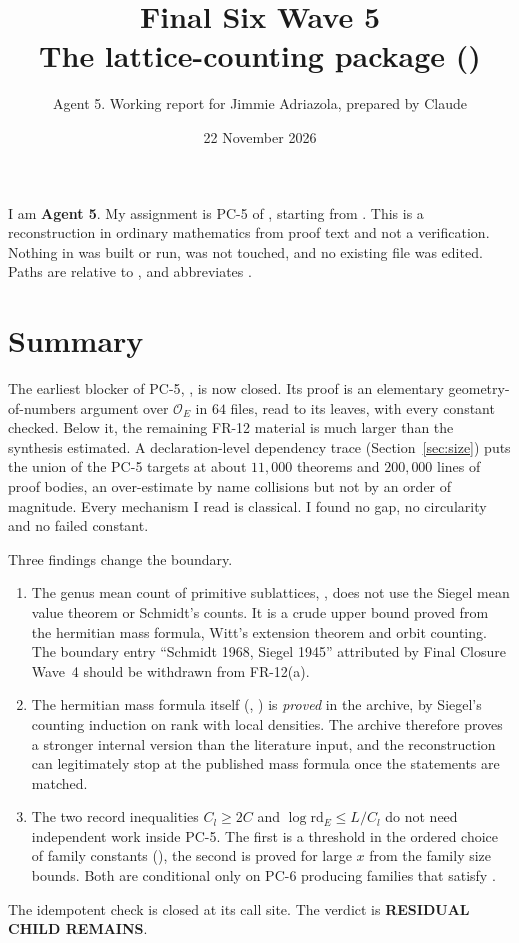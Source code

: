 \documentclass[11pt]{article}
\title{Final Six Wave 5\\ The \FR{12} lattice-counting package (\PC{5})}
\author{Agent 5. Working report for Jimmie Adriazola, prepared by Claude}
\date{22 November 2026}
\newcommand{\FR}[1]{\textsf{FR-#1}}
\newcommand{\PC}[1]{\textsf{PC-#1}}
\newcommand{\Ok}{\mathcal O}
\newcommand{\rd}{\mathrm{rd}}
\begin{document}
\maketitle

\noindent I am \textbf{Agent 5}. My assignment is \PC{5} of , starting from . This is a reconstruction in ordinary mathematics from proof text and not a verification. Nothing in  was built or run,  was not touched, and no existing file was edited. Paths are relative to , and  abbreviates .

\section{Summary}

The earliest blocker of \PC{5}, , is now closed. Its proof is an elementary geometry-of-numbers argument over $\Ok_E$ in $64$ files, read to its leaves, with every constant checked. Below it, the remaining \FR{12} material is much larger than the synthesis estimated. A declaration-level dependency trace (Section~\ref{sec:size}) puts the union of the \PC{5} targets at about $11{,}000$ theorems and $200{,}000$ lines of proof bodies, an over-estimate by name collisions but not by an order of magnitude. Every mechanism I read is classical. I found no gap, no circularity and no failed constant.

Three findings change the boundary.
\begin{enumerate}[leftmargin=*]
\item The genus mean count of primitive sublattices, , does not use the Siegel mean value theorem or Schmidt's counts. It is a crude upper bound proved from the hermitian mass formula, Witt's extension theorem and orbit counting. The boundary entry ``Schmidt 1968, Siegel 1945'' attributed by Final Closure Wave~4 should be withdrawn from \FR{12}(a).
\item The hermitian mass formula itself (, ) is \emph{proved} in the archive, by Siegel's counting induction on rank with local densities. The archive therefore proves a stronger internal version than the literature input, and the reconstruction can legitimately stop at the published mass formula once the statements are matched.
\item The two record inequalities $C_l\ge 2C$ and $\log\rd_E\le L/C_l$ do not need independent work inside \PC{5}. The first is a threshold in the ordered choice of family constants (), the second is proved for large $x$ from the family size bounds. Both are conditional only on \PC{6} producing families that satisfy .
\end{enumerate}
The  idempotent check is closed at its call site. The verdict is \textbf{RESIDUAL CHILD REMAINS}.
\end{document}

